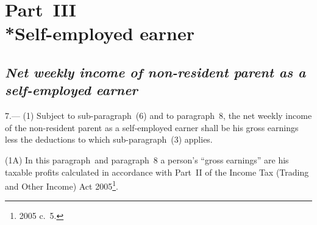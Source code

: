 \documentclass[12pt,a4paper]{article}
\begin{document}

\section[Part~III --- Self-employed earner]{Part~III\\*Self-employed earner}

\renewcommand\parthead{--- Schedule~Part~III}

\subsection*{\itshape 
Net weekly income of non-resident parent as a self-employed earner  %
}

7.---%
%
%
(1) Subject to sub-paragraph~(6) and to paragraph~8, the net weekly income of the non-resident parent as a self-employed earner shall be his gross earnings less the deductions to which sub-paragraph~(3) applies.

(1A) In this paragraph~and paragraph~8 a person’s “gross earnings” are his taxable profits calculated in accordance with Part~II of the Income Tax (Trading and Other Income) Act 2005\footnote{2005 c.\ 5.}.

\end{document}
